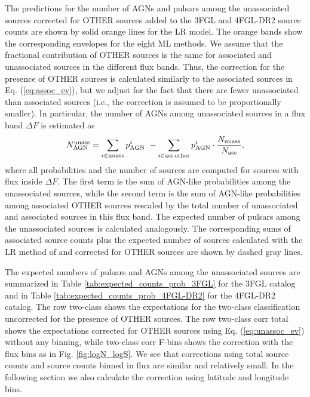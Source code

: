 \documentclass[referee]{aa} %
\newcommand{\bea}{\begin{eqnarray}}
\newcommand{\eea}{\end{eqnarray}}
\newcommand{\lb}{\label}
\begin{document}
The predictions for the number of AGNs and pulsars among the unassociated sources corrected for OTHER sources 
added to the 3FGL and 4FGL-DR2  source counts are shown by solid orange lines for the LR model.
The orange bands show the corresponding envelopes for the eight ML methods.
We assume that the fractional contribution of OTHER sources is the same for associated and unassociated sources in the different flux bands.
Thus, the correction for the presence of OTHER sources is calculated similarly to the associated sources in Eq. (\ref{eq:assoc_ev}),
but we adjust for the fact that there are fewer unassociated than associated sources (i.e., 
the correction is assumed to be proportionally smaller).
In particular, the number of AGNs among unassociated sources in a flux band $\Delta F$ is estimated as
\bea
\lb{eq:unassoc_ev}
N_{\rm AGN}^{\rm unass} = \sum_{i \in \rm unass} p^i_{\rm AGN}\,\, - \sum_{i \in \rm ass\,other} p^i_{\rm AGN} \cdot 
\frac{N_{\rm unass}}{N_{\rm ass}}
,\eea
where all probabilities and the number of sources are computed for sources with flux inside $\Delta F$.
The first term is the sum of AGN-like probabilities among the unassociated sources,
while the second term is the sum of AGN-like probabilities among associated OTHER sources rescaled by the total number
of unassociated and associated sources in this flux band.
The expected number of pulsars among the unassociated sources is calculated analogously.
The corresponding sums of associated source counts plus the expected number of sources calculated with the LR method of \cite{2016ApJ...820....8S} 
and corrected for OTHER sources are shown by dashed gray lines.


The expected numbers of pulsars and AGNs among the unassociated sources
are summarized in Table \ref{tab:expected_counts_prob_3FGL} for the 3FGL catalog and 
in Table \ref{tab:expected_counts_prob_4FGL-DR2} for the 4FGL-DR2 catalog.
The row two-class shows the expectations for the two-class classification uncorrected for the presence of OTHER sources.
The row two-class corr total shows the expectations corrected for OTHER sources using Eq. (\ref{eq:unassoc_ev}) without any binning,
while two-class corr F-bins shows the correction with the flux bins as in Fig. \ref{fig:logN_logS}.
We see that corrections using total source counts and source counts binned in flux are similar and relatively small.
In the following section we also calculate the correction using latitude and longitude bins.
\end{document}
